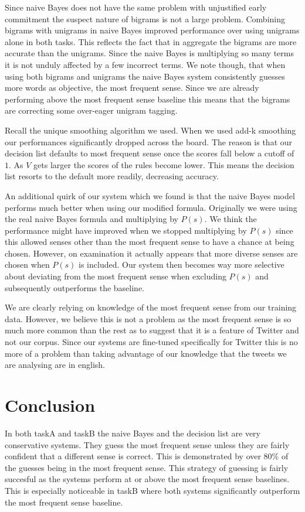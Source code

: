 \documentclass[11pt]{article}
\begin{document}
Since naive Bayes does not have the same problem with unjustified early commitment the suspect nature of bigrams is not a large problem. Combining bigrams with unigrams in naive Bayes improved performance over using unigrams alone in both tasks. This reflects the fact that in aggregate the bigrams are more accurate than the unigrams. Since the naive Bayes is multiplying so many terms it is not unduly affected by a few incorrect terms. We note though, that when using both bigrams and unigrams the naive Bayes system consistently guesses more words as objective, the most frequent sense. Since we are already performing above the most frequent sense baseline this means that the bigrams are correcting some over-eager unigram tagging. 

Recall the unique smoothing algorithm we used. When we used add-k smoothing our performances significantly dropped across the board. The reason is that our decision list defaults to most frequent sense once the scores fall below a cutoff of $1$. As $V$ gets larger the scores of the rules become lower. This means the decision list resorts to the default more readily, decreasing accuracy. 

An additional quirk of our system which we found is that the naive Bayes model performs much better when using our modified formula. Originally we were using the real naive Bayes formula and multiplying by $P(s)$. We think the performance might have improved when we stopped multiplying by $P(s)$ since this allowed senses other than the most frequent sense to have a chance at being chosen. However, on examination it actually appears that more diverse senses are chosen when $P(s)$ is included. Our system then becomes way more selective about deviating from the most frequent sense when excluding $P(s)$ and subsequently outperforms the baseline.

We are clearly relying on knowledge of the most frequent sense from our training data. However, we believe this is not a problem as the most frequent sense is so much more common than the rest as to suggest that it is a feature of Twitter and not our corpus. Since our systems are fine-tuned specifically for Twitter this is no more of a problem than taking advantage of our knowledge that the tweets we are analysing are in english.


\section{Conclusion}
In both taskA and taskB the naive Bayes and the decision list are very conservative systems. They guess the most frequent sense unless they are fairly confident that a different sense is correct. This is demonstrated by over $80\%$ of the guesses being in the most frequent sense. This strategy of guessing is fairly succesful as the systems perform at or above the most frequent sense baselines. This is especially noticeable in taskB where both systems significantly outperform the most frequent sense baseline. 
\end{document}
